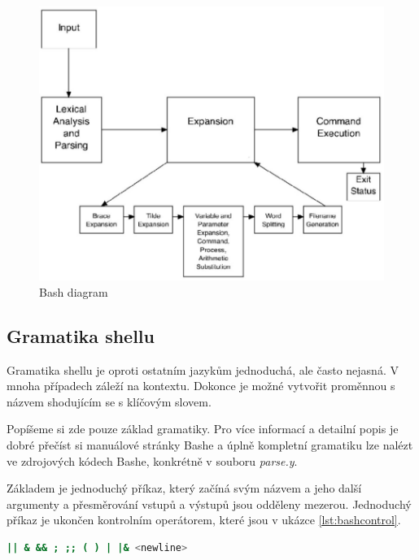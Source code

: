 \documentclass[thesis=M,czech]{FITthesis}[2012/06/26]
\begin{document}
\begin{figure}[htb]\centering
	\includegraphics[width=\textwidth]{./images/bash-article-diagram}
	\caption{Bash diagram}
	\label{fig:bash_diag}
\end{figure}




%
%
%
\subsection{Gramatika shellu}

Gramatika shellu je oproti ostatním jazykům jednoduchá, ale často nejasná. V mnoha případech záleží na kontextu. Dokonce je možné vytvořit proměnnou s názvem shodujícím se s klíčovým slovem.

Popíšeme si zde pouze základ gramatiky. Pro více informací a detailní popis je dobré přečíst si manuálové stránky Bashe a úplně kompletní gramatiku lze nalézt ve zdrojových kódech Bashe, konkrétně v souboru \textit{parse.y}.

Základem je jednoduchý příkaz, který začíná svým názvem a jeho další argumenty a přesměrování vstupů a výstupů jsou odděleny mezerou. Jednoduchý příkaz je ukončen kontrolním operátorem, které jsou v ukázce \ref{lst:bashcontrol}.

\begin{minipage}{\linewidth}
\begin{lstlisting}[language=bash, caption={Kontrolní operátory v Bashi}, label={lst:bashcontrol}]
|| & && ; ;; ( ) | |& <newline>
\end{lstlisting}
\end{minipage}
\end{document}
